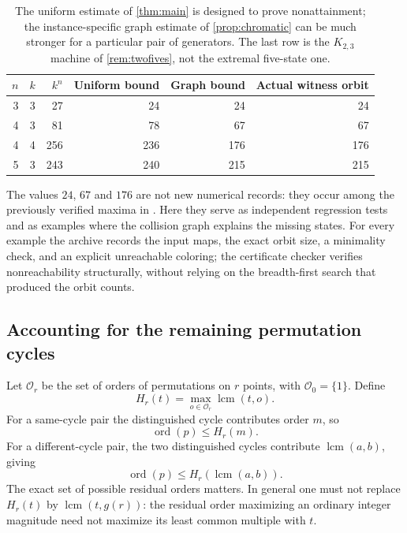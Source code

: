 \documentclass[11pt,a4paper]{article}
\numberwithin{equation}{section}
\theoremstyle{definition}
\theoremstyle{remark}
\newcommand{\ord}{\operatorname{ord}}
\newcommand{\lcm}{\operatorname{lcm}}
\begin{document}
\begin{table}[htbp]
\centering
\begin{tabular}{@{}rrrrrr@{}}
\toprule
$n$ & $k$ & $k^n$ & Uniform bound & Graph bound & Actual witness orbit\\
\midrule
3 & 3 & 27 & 24 & 24 & 24\\
4 & 3 & 81 & 78 & 67 & 67\\
4 & 4 & 256 & 236 & 176 & 176\\
5 & 3 & 243 & 240 & 215 & 215\\
\bottomrule
\end{tabular}
\caption{The uniform estimate of \cref{thm:main} is designed to prove
nonattainment; the instance-specific graph estimate of \cref{prop:chromatic}
can be much stronger for a particular pair of generators. The last row is the
$K_{2,3}$ machine of \cref{rem:twofives}, not the extremal five-state one.}
\label{tab:examples}
\end{table}

The values $24$, $67$ and $176$ are not new numerical records: they occur
among the previously verified maxima in \cite[Table~3]{Davies2017}. Here they
serve as independent regression tests and as examples where the collision
graph explains the missing states. For every example the archive records the
input maps, the exact orbit size, a minimality check, and an explicit
unreachable coloring; the certificate checker verifies nonreachability
structurally, without relying on the breadth-first search that produced the
orbit counts.

\subsection{Accounting for the remaining permutation cycles}

Let $\mathcal O_r$ be the set of orders of permutations on $r$ points,
with $\mathcal O_0=\{1\}$. Define
\begin{equation}\label{eq:H}
 H_r(t)=\max_{o\in\mathcal O_r}\lcm(t,o).
\end{equation}
For a same-cycle pair the distinguished cycle contributes order $m$, so
\[
 \ord(p)\le H_r(m).
\]
For a different-cycle pair, the two distinguished cycles contribute
$\lcm(a,b)$, giving
\[
 \ord(p)\le H_r(\lcm(a,b)).
\]
The exact set of possible residual orders matters. In general one must not
replace $H_r(t)$ by $\lcm(t,g(r))$: the residual order maximizing an ordinary
integer magnitude need not maximize its least common multiple with $t$.
\end{document}
